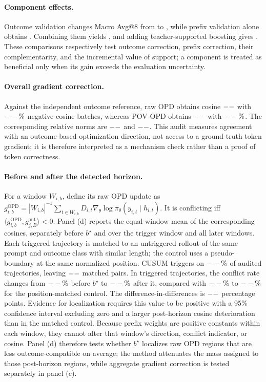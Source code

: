 \paragraph{Component effects.}
Outcome validation changes Macro Avg@8 from \AblOPDAvg{} to \AblOutcomeAvg{}, while prefix validation alone obtains \AblPrefixAvg{}.  Combining them yields \AblOutcomePrefixAvg{}, and adding teacher-supported boosting gives \AblFullAvg{}.  These comparisons respectively test outcome correction, prefix correction, their complementarity, and the incremental value of support; a component is treated as beneficial only when its gain exceeds the evaluation uncertainty.

\paragraph{Overall gradient correction.}
Against the independent outcome reference, raw OPD obtains cosine \(--\) with \(--\%\) negative-cosine batches, whereas POV-OPD obtains \(--\) with \(--\%\).  The corresponding relative norms are \(--\) and \(--\).  This audit measures agreement with an outcome-based optimization direction, not access to a ground-truth token gradient; it is therefore interpreted as a mechanism check rather than a proof of token correctness.

\paragraph{Before and after the detected horizon.}
For a window $W_{i,b}$, define its raw OPD update as $g^{\mathrm{OPD}}_{i,b}=|W_{i,b}|^{-1}\sum_{t\in W_{i,b}}D_{i,t}\nabla_\theta\log\pi_\theta(y_{i,t}\mid h_{i,t})$.  It is conflicting iff $\langle g^{\mathrm{OPD}}_{i,b},g^{\mathrm{out}}_{j,B}\rangle<0$.  Panel (d) reports the equal-window mean of the corresponding cosines, separately before $b^\star$ and over the trigger window and all later windows.  Each triggered trajectory is matched to an untriggered rollout of the same prompt and outcome class with similar length; the control uses a pseudo-boundary at the same normalized position.  CUSUM triggers on \(--\%\) of audited trajectories, leaving \(--\) matched pairs.  In triggered trajectories, the conflict rate changes from \(--\%\) before $b^\star$ to \(--\%\) after it, compared with \(--\%\) to \(--\%\) for the position-matched control.  The difference-in-differences is \(--\) percentage points.  Evidence for localization requires this value to be positive with a 95\% confidence interval excluding zero and a larger post-horizon cosine deterioration than in the matched control.  Because prefix weights are positive constants within each window, they cannot alter that window's direction, conflict indicator, or cosine.  Panel (d) therefore tests whether $b^\star$ localizes raw OPD regions that are less outcome-compatible on average; the method attenuates the mass assigned to those post-horizon regions, while aggregate gradient correction is tested separately in panel (c).
